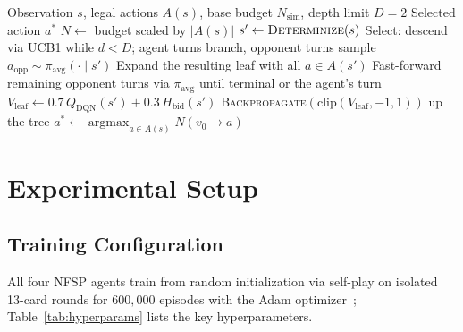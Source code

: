 \documentclass[conference]{IEEEtran}
\begin{document}
\begin{algorithm}[htbp]
\caption{PANES Decision Procedure}
\label{alg:mcnfsp}
\begin{algorithmic}[1]
\REQUIRE Observation $s$, legal actions $A(s)$, base budget $N_{\text{sim}}$, depth limit $D=2$
\ENSURE Selected action $a^*$
\STATE $N \leftarrow$ budget scaled by $|A(s)|$ 
    \STATE $s' \leftarrow \textsc{Determinize}(s)$ 
    \STATE Select: descend via UCB1 while $d<D$; agent turns branch, opponent turns sample $a_{\text{opp}}\sim\pi_{\text{avg}}(\cdot\mid s')$
    \STATE Expand the resulting leaf with all $a\in A(s')$
    \STATE Fast-forward remaining opponent turns via $\pi_{\text{avg}}$ until terminal or the agent's turn
    \STATE $V_{\text{leaf}} \leftarrow 0.7\,Q_{\text{DQN}}(s') + 0.3\,H_{\text{bid}}(s')$
    \STATE \textsc{Backpropagate}$(\text{clip}(V_{\text{leaf}},-1,1))$ up the tree
\ENDFOR
\RETURN $a^* \leftarrow \operatorname*{argmax}_{a\in A(s)} N(v_0\rightarrow a)$
\end{algorithmic}
\end{algorithm}
\section{\large \textbf{Experimental Setup}}
 
\subsection{\textbf{Training Configuration}}
 
All four NFSP agents train from random initialization via self-play on isolated 13-card rounds for $600{,}000$ episodes with the Adam optimizer~\cite{kingma2015adam}; Table~\ref{tab:hyperparams} lists the key hyperparameters.
 
\end{document}
